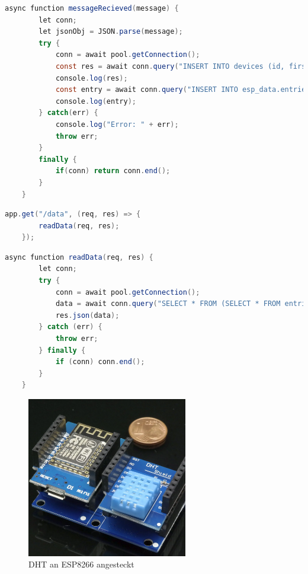 \begin{lstlisting}[language=java, caption={Funktion: messageRecieved}, label=lst:function_message_recieved]
	async function messageRecieved(message) {
		let conn;
		let jsonObj = JSON.parse(message);
		try {
			conn = await pool.getConnection();
			const res = await conn.query("INSERT INTO devices (id, first_entry, last_entry) VALUES (?, ?, ?) ON DUPLICATE KEY UPDATE last_entry = VALUES (last_entry);", [jsonObj.device_id, jsonObj.timestamp, jsonObj.timestamp]);
			console.log(res);
			const entry = await conn.query("INSERT INTO esp_data.entries (esp_id, altitude, pressure, temperature, humidity, recorded_at) VALUES (?, ?, ?, ?, ?, ?);", [jsonObj.device_id, jsonObj.altitude, jsonObj.airPressure, jsonObj.temperature, jsonObj.humidity, jsonObj.timestamp]);
			console.log(entry);
		} catch(err) {
			console.log("Error: " + err);
			throw err;
		}
		finally {
			if(conn) return conn.end();
		}
	}
\end{lstlisting}

\begin{lstlisting}[language=java, caption={Route: getData}, label=lst:route_get_data]
	app.get("/data", (req, res) => {
		readData(req, res);
	});
\end{lstlisting}

\begin{lstlisting}[language=java, caption={Funktion: readData}, label=lst:function_read_data]
	async function readData(req, res) {
		let conn;
		try {
			conn = await pool.getConnection();
			data = await conn.query("SELECT * FROM (SELECT * FROM entries ORDER BY recorded_at DESC LIMIT 1000) AS subquery ORDER BY id ASC;");
			res.json(data);
		} catch (err) {
			throw err;
		} finally {
			if (conn) conn.end();
		}
	}
\end{lstlisting}

\begin{figure}[h]
	\centering
	\includegraphics[width=7cm]{images/esp_dht.png}
	\caption[dht\_an\_esp]{DHT an ESP8266 angesteckt}
	\label{fig:dht_an_esp}
\end{figure}

